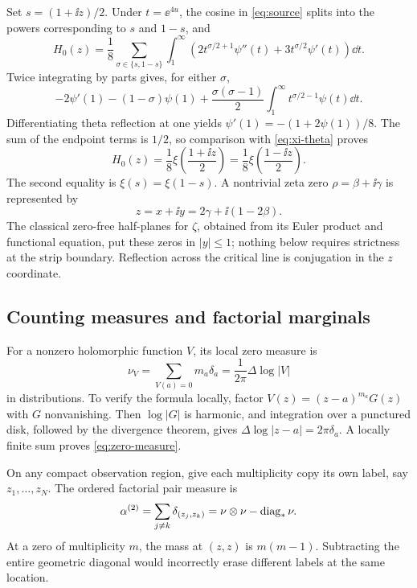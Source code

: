 Set $s=(1+\ii z)/2$. Under $t=\ee^{4u}$, the cosine in
\eqref{eq:source} splits into the powers corresponding to $s$ and $1-s$,
and
\[
 H_0(z)=\frac18\sum_{\sigma\in\{s,1-s\}}
   \int_1^\infty
   \left(2t^{\sigma/2+1}\psi''(t)
                +3t^{\sigma/2}\psi'(t)\right)\dd t .
\]
Twice integrating by parts gives, for either $\sigma$,
\[
 -2\psi'(1)-(1-\sigma)\psi(1)
 +\frac{\sigma(\sigma-1)}2
       \int_1^\infty t^{\sigma/2-1}\psi(t)\dd t .
\]
Differentiating theta reflection at one yields
$\psi'(1)=-(1+2\psi(1))/8$. The sum of the endpoint terms is
$1/2$, so comparison with \eqref{eq:xi-theta} proves
\begin{equation}\label{eq:xi-normalization}
 H_0(z)=\frac18\xi\!\left(\frac{1+\ii z}{2}\right)
       =\frac18\xi\!\left(\frac{1-\ii z}{2}\right).
\end{equation}
The second equality is $\xi(s)=\xi(1-s)$. A nontrivial zeta zero
$\rho=\beta+\ii\gamma$ is represented by
\begin{equation}\label{eq:coordinates}
 z=x+\ii y=2\gamma+\ii(1-2\beta).
\end{equation}
The classical zero-free half-planes for $\zeta$, obtained from its Euler
product and functional equation, put these zeros in $|y|\le1$; nothing
below requires strictness at the strip boundary. Reflection across the
critical line is conjugation in the $z$ coordinate.

\subsection{Counting measures and factorial marginals}

For a nonzero holomorphic function $V$, its local zero measure is
\begin{equation}\label{eq:zero-measure}
 \nu_V=\sum_{V(a)=0}m_a\delta_a
       =\frac1{2\pi}\Delta\log|V|
\end{equation}
in distributions. To verify the formula locally, factor
$V(z)=(z-a)^{m_a}G(z)$ with $G$ nonvanishing. Then
$\log|G|$ is harmonic, and integration over a punctured disk, followed
by the divergence theorem, gives
$\Delta\log|z-a|=2\pi\delta_a$. A locally finite sum proves
\eqref{eq:zero-measure}.

On any compact observation region, give each multiplicity copy its own
label, say $z_1,\ldots,z_N$. The ordered factorial pair measure is
\begin{equation}\label{eq:factorial}
 \alpha^{(2)}
 =\sum_{j\ne k}\delta_{(z_j,z_k)}
 =\nu\otimes\nu-\operatorname{diag}_*\nu .
\end{equation}
At a zero of multiplicity $m$, the mass at $(z,z)$ is $m(m-1)$.
Subtracting the entire geometric diagonal would incorrectly erase
different labels at the same location.

